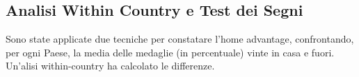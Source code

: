 \subsection{Analisi Within Country e Test dei Segni}\label{sec:methods_within}











Sono state applicate due tecniche per constatare l'home advantage, confrontando,
per ogni Paese, la media delle medaglie (in percentuale) vinte in casa e
fuori.\\
Un'alisi within-country ha calcolato le differenze.\\



